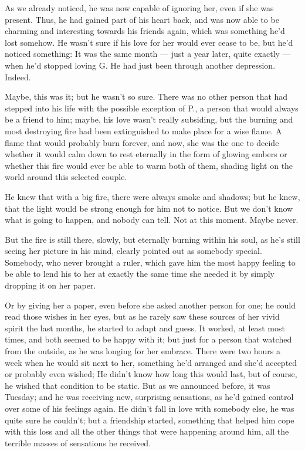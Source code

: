 As we already noticed, he was now capable of ignoring her, even if she was present. 
Thus, he had gained part of his heart back, and was now able to be charming and interesting towards his friends again, which was something he'd lost somehow. 
He wasn't sure if his love for her would ever cease to be, but he'd noticed something: It was the same month --- just a year later, quite exactly --- when he'd stopped loving G. 
He had just been through another depression. 
Indeed.

Maybe, this was it; but he wasn't so sure. There was no other person that had stepped into his life with the possible exception of P., a person that would always be a friend to him; maybe, his love wasn't really subsiding, but the burning and most destroying fire had been extinguished to make place for a wise flame. A flame that would probably burn forever, and now, she was the one to decide whether it would calm down to rest eternally in the form of glowing embers or whether this fire would ever be able to warm both of them, shading light on the world around this selected couple.

He knew that with a big fire, there were always smoke and shadows; but he knew, that the light would be strong enough for him not to notice. 
But we don't know what is going to happen, and nobody can tell. 
Not at this moment. 
Maybe never.

But the fire is still there, slowly, but eternally burning within his soul, as he's still seeing her picture in his mind, clearly pointed out as somebody special. 
Somebody, who never brought a ruler, which gave him the most happy feeling to be able to lend his to her at exactly the same time she needed it by simply dropping it on her paper.

Or by giving her a paper, even before she asked another person for one; he could read those wishes in her eyes, but as he rarely saw these sources of her vivid spirit the last months, he started to adapt and guess.
It worked, at least most times, and both seemed to be happy with it; but just for a person that watched from the outside, as he was longing for her embrace. 
There were two hours a week when he would sit next to her, something he'd arranged and she'd accepted or probably even wished; He didn't know how long this would last, but of course, he wished that condition to be static. 
But as we announced before, it was Tuesday; and he was receiving new, surprising sensations, as he'd gained control over some of his feelings again. 
He didn't fall in love with somebody else, he was quite sure he couldn't; but a friendship started, something that helped him cope with this loss and all the other things that were happening around him, all the terrible masses of sensations he received.

